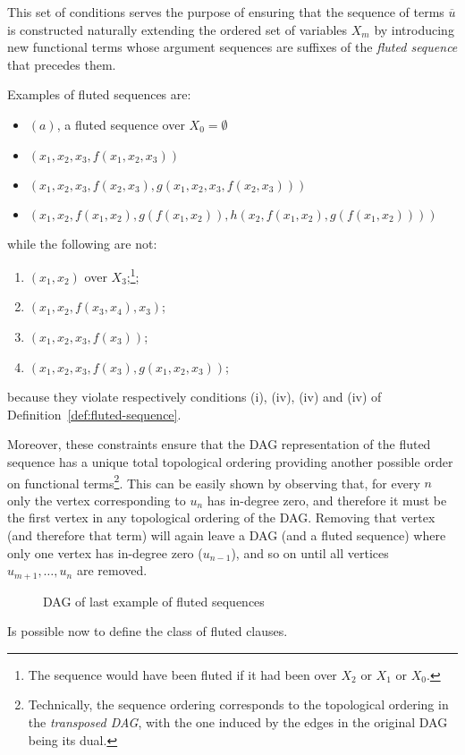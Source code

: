 This set of conditions serves the purpose of ensuring that the sequence of terms \(\overline{u}\) is constructed naturally extending the ordered set of variables \(X_m\) by introducing new functional terms whose argument sequences are suffixes of the \emph{fluted sequence} that precedes them.

Examples of fluted sequences are:
\begin{itemize}
  \item \((a)\), a fluted sequence over \(X_0=\emptyset\)
  \item \((x_1,x_2,x_3,f(x_1,x_2,x_3))\)
  \item \((x_1,x_2,x_3,f(x_2,x_3),g(x_1,x_2,x_3,f(x_2,x_3)))\)
  \item \((x_1,x_2,f(x_1,x_2),g(f(x_1,x_2)),h(x_2,f(x_1,x_2),g(f(x_1,x_2))))\)
\end{itemize}
while the following are not:
\begin{enumerate}[label= (\roman*)]
  \item \((x_1,x_2)\) over \(X_3\);\footnote{The sequence would have been fluted if it had been over \(X_2\) or \(X_1\) or \(X_0\).};
  \item \((x_1,x_2,f(x_3,x_4),x_3)\);
  \item \((x_1,x_2,x_3,f(x_3))\);
  \item \((x_1,x_2,x_3,f(x_3),g(x_1,x_2,x_3))\);
\end{enumerate}
because they violate respectively conditions (i), (iv), (iv) and (iv) of Definition~\ref{def:fluted-sequence}.

Moreover, these constraints ensure that the DAG representation of the fluted sequence has a unique total topological ordering providing another possible order on functional terms\footnote{Technically, the sequence ordering corresponds to the topological ordering in the \emph{transposed DAG}, with the one induced by the edges in the original DAG being its dual.}.
This can be easily shown by observing that, for every \(n\) only the vertex corresponding to \(u_n\) has in-degree zero, and therefore it must be the first vertex in any topological ordering of the DAG\@. Removing that vertex (and therefore that term) will again leave a DAG (and a fluted sequence) where only one vertex has in-degree zero (\(u_{n-1}\)), and so on until all vertices \(u_{m+1},\ldots, u_n\) are removed.

\begin{figure}[H]
\centering
{}
\caption{DAG of last example of fluted sequences}
\end{figure}
Is possible now to define the class of fluted clauses.

